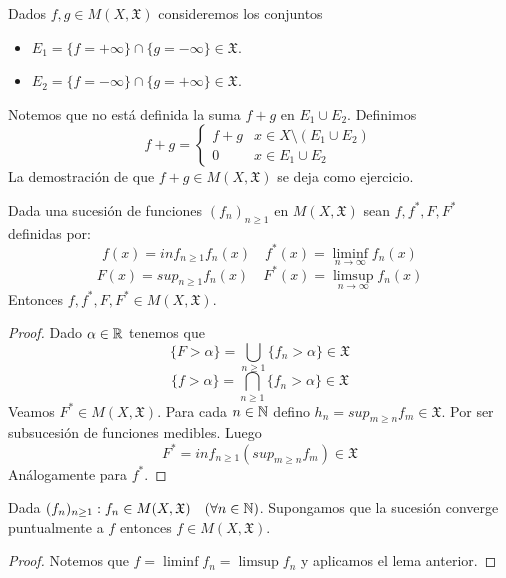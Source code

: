\clearpage

\begin{note}
    Dados $f, g \in M(X, \mathfrak{X})$ consideremos los conjuntos \begin{itemize}
        \item $E_1 = \{ f = + \infty \} \cap \{ g = - \infty \} \in \mathfrak{X}$.
        \item $E_2 = \{ f = - \infty \} \cap \{ g = + \infty \} \in \mathfrak{X}$.
    \end{itemize}
    Notemos que no está definida la suma $f + g$ en $E_1 \cup E_2$.
    Definimos \begin{equation}
        f+g = \begin{cases}
            f+g & x \in X \setminus (E_1 \cup E_2) \\
            0   & x \in E_1 \cup E_2
        \end{cases}
    \end{equation}
    La demostración de que $f+g \in M(X, \mathfrak{X})$ se deja como ejercicio.
\end{note}

\begin{lemma}
    Dada una sucesión de funciones $(f_n)_{n \geq 1}$ en $M(X, \mathfrak{X})$ sean $f, f^*, F, F^*$ definidas por:
    \begin{equation}
        f(x) = inf_{n \geq 1} f_n(x) \quad f^*(x) = \liminf_{n \to \infty} f_n(x)
    \end{equation}
    \begin{equation}
        F(x) = sup_{n \geq 1} f_n(x) \quad F^*(x) = \limsup_{n \to \infty} f_n(x)
    \end{equation}
    Entonces $f, f^*, F, F^* \in M(X, \mathfrak{X})$.
    \begin{proof}
        Dado $\alpha \in \mathbb{R}$ tenemos que \begin{equation}
            \{ F > \alpha \} = \bigcup_{n \geq 1} \{ f_n > \alpha \} \in \mathfrak{X}
        \end{equation}
        \begin{equation}
            \{ f > \alpha \} = \bigcap_{n \geq 1} \{ f_n > \alpha \} \in \mathfrak{X}
        \end{equation}
        Veamos $F^* \in M(X, \mathfrak{X})$. Para cada $n \in \mathbb{N}$ defino $h_n = sup_{m \geq n} f_m \in \mathfrak{X}$. Por ser subsucesión de funciones medibles.
        Luego \begin{equation}
            F^* = inf_{n \geq 1} (sup_{m \geq n} f_m) \in \mathfrak{X}
        \end{equation}
        Análogamente para $f^*$.
    \end{proof}
\end{lemma}

\begin{corollary}
    Dada $(f_n)_{n \geq 1} : f_n \in M(X, \mathfrak{X}) \quad (\forall n \in \mathbb{N})$. Supongamos que la sucesión converge puntualmente a $f$ entonces $f \in M(X, \mathfrak{X})$.
    \begin{proof}
        Notemos que $f = \liminf f_n = \limsup f_n$ y aplicamos el lema anterior.
    \end{proof}
\end{corollary}